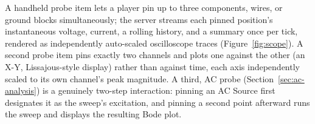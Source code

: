 A handheld probe item lets a player pin up to three components, wires, or ground blocks
simultaneously; the server streams each pinned position's instantaneous voltage, current, a
rolling history, and a summary once per tick, rendered as independently auto-scaled
oscilloscope traces (Figure~\ref{fig:scope}). A second probe item pins exactly two channels
and plots one against the other (an X-Y, Lissajous-style display) rather than against time,
each axis independently scaled to its own channel's peak magnitude. A third, AC probe
(Section~\ref{sec:ac-analysis}) is a genuinely two-step interaction: pinning an AC Source
first designates it as the sweep's excitation, and pinning a second point afterward runs the
sweep and displays the resulting Bode plot.
